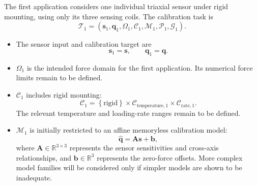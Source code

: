 \documentclass[11pt,a4paper]{article}
\begin{document}
The first application considers one individual triaxial sensor under rigid
mounting, using only its three sensing coils. The calibration task is
\begin{equation}
    \mathcal{T}_1
    =
    \left(
        \mathbf{s}_1,
        \mathbf{q}_1,
        \Omega_1,
        \mathcal{C}_1,
        \mathcal{M}_1,
        \mathcal{P}_1,
        \mathcal{G}_1
    \right).
\end{equation}

\begin{itemize}
    \item The sensor input and calibration target are
    \begin{equation}
        \mathbf{s}_1=\mathbf{s},
        \qquad
        \mathbf{q}_1=\mathbf{q}.
    \end{equation}

    \item $\Omega_1$ is the intended force domain for the first application.
    Its numerical force limits remain to be defined.

    \item $\mathcal{C}_1$ includes rigid mounting:
    \begin{equation}
        \mathcal{C}_1
        =
        \left\{\mathrm{rigid}\right\}
        \times
        \mathcal{C}_{\mathrm{temperature},1}
        \times
        \mathcal{C}_{\mathrm{rate},1}.
    \end{equation}
    The relevant temperature and loading-rate ranges remain to be defined.

    \item $\mathcal{M}_1$ is initially restricted to an affine memoryless
    calibration model:
    \begin{equation}
        \widehat{\mathbf{q}}
        =
        \mathbf{A}\mathbf{s}+\mathbf{b},
    \end{equation}
    where $\mathbf{A}\in\mathbb{R}^{3\times3}$ represents the sensor
    sensitivities and cross-axis relationships, and
    $\mathbf{b}\in\mathbb{R}^{3}$ represents the zero-force offsets. More
    complex model families will be considered only if simpler models are shown
    to be inadequate.


\end{itemize}
\end{document}
